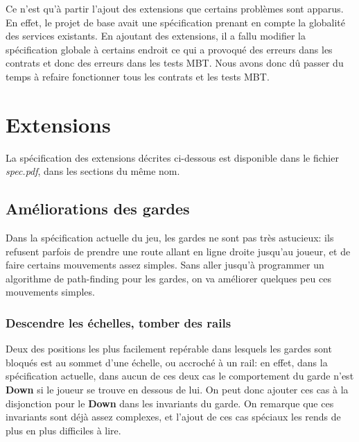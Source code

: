 \documentclass{article}
\begin{document}
Ce n'est qu'à partir l'ajout des extensions que certains problèmes sont apparus. En effet, le projet de base avait une spécification prenant en compte la globalité des services existants. En ajoutant des extensions, il a fallu modifier la spécification globale à certains endroit ce qui a provoqué des erreurs dans les contrats et donc des erreurs dans les tests MBT. Nous avons donc dû passer du temps à refaire fonctionner tous les contrats et les tests MBT.

\section{Extensions}
La spécification des extensions décrites ci-dessous est disponible dans le fichier \textit{spec.pdf}, dans les sections du même nom.

\subsection{Améliorations des gardes}
Dans la spécification actuelle du jeu, les gardes ne sont pas très astucieux: ils refusent parfois de prendre une route allant en ligne droite jusqu'au joueur, et de faire certains mouvements assez simples. Sans aller jusqu'à programmer un algorithme de path-finding pour les gardes, on va améliorer quelques peu ces mouvements simples.

\subsubsection{Descendre les échelles, tomber des rails}
Deux des positions les plus facilement repérable dans lesquels les gardes sont bloqués est au sommet d'une échelle, ou accroché à un rail: en effet, dans la spécification actuelle, dans aucun de ces deux cas le comportement du garde n'est \textbf{Down} si le joueur se trouve en dessous de lui. On peut donc ajouter ces cas à la disjonction pour le \textbf{Down} dans les invariants du garde. On remarque que ces invariants sont déjà assez complexes, et l'ajout de ces cas spéciaux les rends de plus en plus difficiles à lire.
\end{document}
